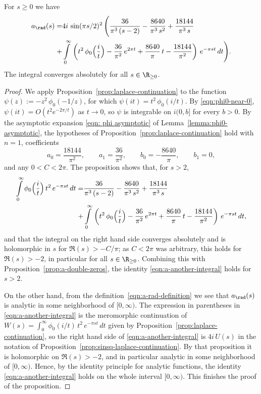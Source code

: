 \begin{proposition}\label{prop:a-another-integral}\leanok
For $s\geq0$ we have
\begin{align}\label{eqn:a-another-integral}a_\rad(s)=&4i\,\sin(\pi s/2)^2\,\Bigg(\frac{36}{\pi^3\,(s-2)}-\frac{8640}{\pi^3\,s^2}+\frac{18144}{\pi^3\,s}\\ +&\int\limits_0^\infty\,\left(t^2\,\phi_0\Big(\frac{i}{t}\Big)-\frac{36}{\pi^2}\,e^{2\pi t}+\frac{8640}{\pi}\,t-\frac{18144}{\pi^2}\right)\,e^{-\pi s t}\,dt \Bigg) .\notag\end{align}
The integral converges absolutely for all $s\in\R_{\geq 0}$.
\end{proposition}
\begin{proof}
We apply Proposition~\ref{prop:laplace-continuation} to the function $\psi(z) := -z^2\,\phi_0(-1/z)$, for which $\psi(it) = t^2\,\phi_0(i/t)$.
By \eqref{eqn:phi0-near-0}, $\psi(it) = O(t^2 e^{-2\pi/t})$ as $t \to 0$, so $\psi$ is integrable on $i(0, b]$ for every $b > 0$.
By the asymptotic expansion \eqref{eqn: phi asymptotic} of Lemma~\ref{lemma:phi0-asymptotic}, the hypotheses of Proposition~\ref{prop:laplace-continuation} hold with $n = 1$, coefficients
\[
a_0 = \frac{18144}{\pi^2}, \qquad a_1 = \frac{36}{\pi^2}, \qquad b_0 = -\frac{8640}{\pi}, \qquad b_1 = 0,
\]
and any $0 < C < 2\pi$. The proposition shows that, for $s > 2$,
\begin{align}
\int\limits_{0}^{\infty}\phi_0\Big(\frac{i}{t}\Big)\,t^2\,e^{-\pi s t}\,dt
=&\frac{36}{\pi^3\,(s-2)}-\frac{8640}{\pi^3\,s^2}+\frac{18144}{\pi^3\,s}\notag\\
+&\int\limits_0^\infty\,\left(t^2\,\phi_0\Big(\frac{i}{t}\Big)-\frac{36}{\pi^2}\,e^{2\pi t}+\frac{8640}{\pi}\,t-\frac{18144}{\pi^2}\right)\,e^{-\pi s t}\,dt,\notag
\end{align}
and that the integral on the right hand side converges absolutely and is holomorphic in $s$ for $\Re(s) > -C/\pi$; as $C < 2\pi$ was arbitrary, this holds for $\Re(s) > -2$, in particular for all $s \in \R_{\geq 0}$.
Combining this with Proposition~\ref{prop:a-double-zeros}, the identity \eqref{eqn:a-another-integral} holds for $s>2$.

On the other hand, from the definition~\eqref{eqn:a-rad-definition} we see that $a_\rad(s)$ is analytic in some neighborhood of $[0,\infty)$.
The expression in parentheses in \eqref{eqn:a-another-integral} is the meromorphic continuation of $W(s) = \int_0^\infty \phi_0(i/t)\,t^2\,e^{-\pi s t}\,dt$ given by Proposition~\ref{prop:laplace-continuation}, so the right hand side of \eqref{eqn:a-another-integral} is $4i\,U(s)$ in the notation of Proposition~\ref{prop:sinsq-laplace-continuation}. By that proposition it is holomorphic on $\Re(s) > -2$, and in particular analytic in some neighborhood of $[0,\infty)$. Hence, by the identity principle for analytic functions, the identity \eqref{eqn:a-another-integral} holds on the whole interval $[0,\infty)$. This finishes the proof of the proposition.
\end{proof}
